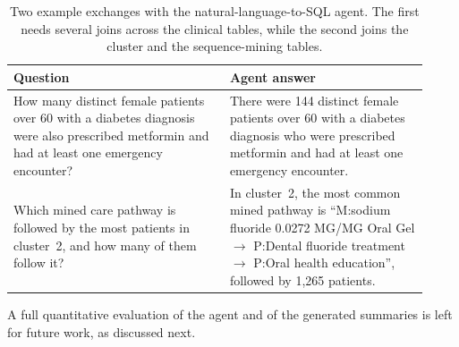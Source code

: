 \begin{table}[t]

\caption{Two example exchanges with the natural-language-to-SQL agent. The first needs several joins across the clinical tables, while the second joins the cluster and the sequence-mining tables.}

\label{tab:agent_example}

\centering

\footnotesize

\begin{tabular}{@{}p{0.48\linewidth}p{0.44\linewidth}@{}}

\toprule

Question & Agent answer \\

\midrule

How many distinct female patients over 60 with a diabetes diagnosis were also prescribed metformin and had at least one emergency encounter? & There were 144 distinct female patients over 60 with a diabetes diagnosis who were prescribed metformin and had at least one emergency encounter. \\[4pt]

Which mined care pathway is followed by the most patients in cluster~2, and how many of them follow it? & In cluster~2, the most common mined pathway is ``M:sodium fluoride 0.0272 MG/MG Oral Gel $\rightarrow$ P:Dental fluoride treatment $\rightarrow$ P:Oral health education'', followed by 1{,}265 patients. \\

\bottomrule

\end{tabular}

\end{table}

A full quantitative evaluation of the agent and of the generated summaries is left for future work, as discussed next.

